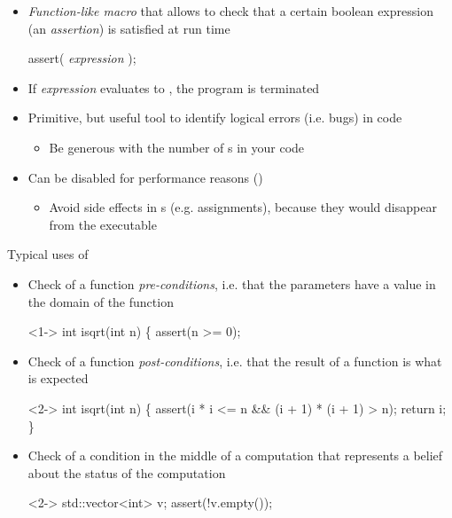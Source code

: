 \begin{frame}[fragile]{}

  \begin{itemize}
  \item \textit{Function-like macro} that allows to check that a certain boolean
    expression (an \textit{assertion}) is satisfied at run time
    \begin{codeblock}
assert( \textit{expression} );\end{codeblock}
  \item If \textit{expression} evaluates to , the program is terminated
  \item<2-> Primitive, but useful tool to identify logical errors (i.e. bugs) in
    code
    \begin{itemize}
    \item Be generous with the number of s in your code
    \end{itemize}
  \item<3-> Can be disabled for performance reasons ()
    \begin{itemize}
    \item Avoid side effects in s (e.g. assignments), because they
      would disappear from the executable
    \end{itemize}

  \end{itemize}
\end{frame}

\begin{frame}[fragile]{Typical uses of }

  \begin{itemize}
  \item<1-> Check of a function \textit{pre-conditions}, i.e. that the
    parameters have a value in the domain of the function

    \begin{codeblock}<1->{
int isqrt(int n) \{
  assert(n >= 0);
  \ddd}\end{codeblock}

  \item<2-> Check of a function \textit{post-conditions}, i.e. that the result of
    a function is what is expected

    \begin{codeblock}<2->{
int isqrt(int n) \{
  \ddd
  assert(i * i <= n && (i + 1) * (i + 1) > n);
  return i;
\}}\end{codeblock}

  \item<3-> Check of a condition in the middle of a computation that represents a
    belief about the status of the computation

    \begin{codeblock}<2->{
std::vector<int> v;
\ddd 
assert(!v.empty());
\ddd}\end{codeblock}

  \end{itemize}

\end{frame}

